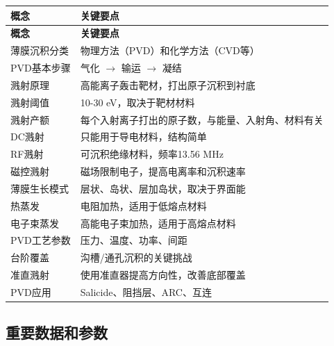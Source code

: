 \documentclass[UTF8,12pt,a4paper]{ctexart}
\begin{document}
\begin{longtable}{|L{3.5cm}|L{11cm}|}
\hline
\textbf{概念} & \textbf{关键要点} \\
\hline
\endfirsthead
\hline
\textbf{概念} & \textbf{关键要点} \\
\hline
\endhead
\hline
\endfoot
\hline
\endlastfoot

薄膜沉积分类 & 物理方法（PVD）和化学方法（CVD等） \\
\hline

PVD基本步骤 & 气化 $\rightarrow$ 输运 $\rightarrow$ 凝结 \\
\hline

溅射原理 & 高能离子轰击靶材，打出原子沉积到衬底 \\
\hline

溅射阈值 & 10-30 eV，取决于靶材材料 \\
\hline

溅射产额 & 每个入射离子打出的原子数，与能量、入射角、材料有关 \\
\hline

DC溅射 & 只能用于导电材料，结构简单 \\
\hline

RF溅射 & 可沉积绝缘材料，频率13.56 MHz \\
\hline

磁控溅射 & 磁场限制电子，提高电离率和沉积速率 \\
\hline

薄膜生长模式 & 层状、岛状、层加岛状，取决于界面能 \\
\hline

热蒸发 & 电阻加热，适用于低熔点材料 \\
\hline

电子束蒸发 & 高能电子束加热，适用于高熔点材料 \\
\hline

PVD工艺参数 & 压力、温度、功率、间距 \\
\hline

台阶覆盖 & 沟槽/通孔沉积的关键挑战 \\
\hline

准直溅射 & 使用准直器提高方向性，改善底部覆盖 \\
\hline

PVD应用 & Salicide、阻挡层、ARC、互连 \\
\hline
\end{longtable}

\subsection{重要数据和参数}
\end{document}
